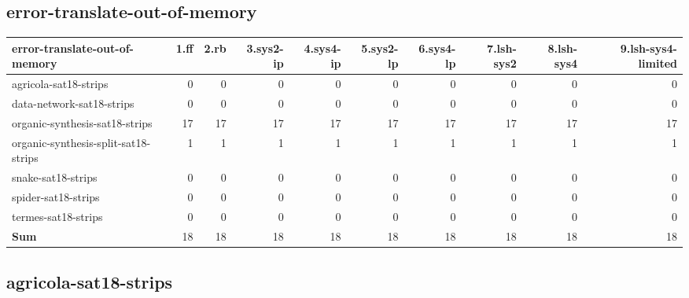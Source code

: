 \documentclass{article}
\begin{document}
\hypertarget{error-error-translate-out-of-memory}{}
\subsection*{error-translate-out-of-memory}

\begin{tabular}{@{}lrrrrrrrrr@{}}
error-translate-out-of-memory & 1.ff & 2.rb & 3.sys2-ip & 4.sys4-ip & 5.sys2-lp & 6.sys4-lp & 7.lsh-sys2 & 8.lsh-sys4 & 9.lsh-sys4-limited \\
\midrule
agricola-sat18-strips & 0 & 0 & 0 & 0 & 0 & 0 & 0 & 0 & 0 \\
data-network-sat18-strips & 0 & 0 & 0 & 0 & 0 & 0 & 0 & 0 & 0 \\
organic-synthesis-sat18-strips & 17 & 17 & 17 & 17 & 17 & 17 & 17 & 17 & 17 \\
organic-synthesis-split-sat18-strips & 1 & 1 & 1 & 1 & 1 & 1 & 1 & 1 & 1 \\
snake-sat18-strips & 0 & 0 & 0 & 0 & 0 & 0 & 0 & 0 & 0 \\
spider-sat18-strips & 0 & 0 & 0 & 0 & 0 & 0 & 0 & 0 & 0 \\
termes-sat18-strips & 0 & 0 & 0 & 0 & 0 & 0 & 0 & 0 & 0 \\
\textbf{Sum} & 18 & 18 & 18 & 18 & 18 & 18 & 18 & 18 & 18 \\
\end{tabular}

\hypertarget{error-agricola-sat18-strips}{}
\subsection*{agricola-sat18-strips}
\end{document}
